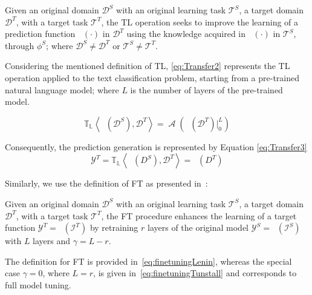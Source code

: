\documentclass[runningheads]{llncs}
\DeclareMathOperator{\ypredtarget}{\phi^{T}}
\DeclareMathOperator{\ypredsource}{\phi^{S}}
\DeclareMathOperator{\ConvNetOut}{\mathcal{A}}
\begin{document}
\begin{definition}
  Given an original domain $\mathcal{D}^{S}$ with an original learning
  task $\mathcal{T}^{S}$, a target domain $\mathcal{D}^{T}$, with a
  target task $\mathcal{T}^{T}$, the TL operation seeks to improve the
  learning of a prediction function $\ypredtarget(\cdot)$ in
  $\mathcal{D}^{T}$ using the knowledge acquired in
  $\ypredsource(\cdot)$ in $\mathcal{T}^{S}$, through $\phi^S$; where
  $\mathcal{D}^{S} \neq \mathcal{D}^{T}$ or
  $\mathcal{T}^{S} \neq \mathcal{T}^{T}$.
\end{definition}

Considering the mentioned definition of TL, \eqref{eq:Transfer2}
represents the TL operation applied to the text classification
problem, starting from a pre-trained natural language model; where $L$
is the number of layers of the pre-trained model.

\begin{equation}
  \mathbb{T_{L}} \left< \ypredsource(\mathcal{D}^{S}), \mathcal{D}^{T}  \right> = \ConvNetOut \left(\ypredsource(\mathcal{D}^{T}) \Bigr\rvert_{0}^{L} \right)
    \label{eq:Transfer2}
\end{equation}

Consequently, the prediction generation is represented by Equation
\eqref{eq:Transfer3}
\begin{equation}
    \mathcal{Y}^{T} = \mathbb{T_{L}} \left< \ypredsource(D^{S}), \mathcal{D}^{T} \right> = \ypredtarget(D^T) 
    \label{eq:Transfer3}
\end{equation}

Similarly, we use the definition of FT as presented
in~\cite{falconi2020transfer}:

\begin{definition}
  Given an original domain $\mathcal{D}^{S}$ with an original learning
  task $\mathcal{T}^{S}$, a target domain $\mathcal{D}^{T}$, with a
  target task $\mathcal{T}^{T}$, the FT procedure enhances the
  learning of a target function
  $\mathcal{Y}^T = \ypredtarget(\mathcal{I}^T)$ by retraining $r$
  layers of the original model
  $\mathcal{Y}^S = \ypredsource(\mathcal{I}^S)$ with $L$ layers and
  $\gamma = L-r$.
\end{definition}

The definition for FT is provided in~\eqref{eq:finetuningLenin},
whereas the special case $\gamma=0$, where $L=r$, is given
in~\eqref{eq:finetuningTunstall} and corresponds to full model tuning.
\end{document}
